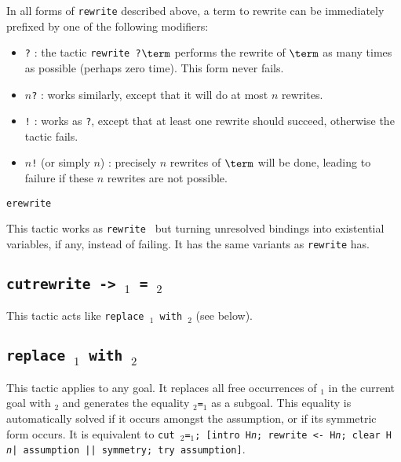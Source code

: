 \begin{coq_example*}
\begin{Variants}
\item In all forms of {\tt rewrite} described above, a term to rewrite
  can be immediately prefixed by one of the following modifiers:
  \begin{itemize}
  \item {\tt ?} : the tactic {\tt rewrite ?$\term$} performs the
    rewrite of $\term$  as many times as possible (perhaps zero time).
    This form never fails.
  \item {\tt $n$?} : works similarly, except that it will do at most
   $n$ rewrites.
  \item {\tt !} : works as {\tt ?}, except that at least one rewrite
    should succeed, otherwise the tactic fails.
  \item {\tt $n$!} (or simply {\tt $n$}) : precisely $n$ rewrites
    of $\term$ will be done, leading to failure if these $n$ rewrites are not possible.
  \end{itemize}

\item {\tt erewrite {\term}}

This tactic works as {\tt rewrite {\term}} but turning unresolved
bindings into existential variables, if any, instead of failing. It has
the same variants as {\tt rewrite} has.

\end{Variants}


\subsection{\tt cutrewrite -> \term$_1$ = \term$_2$
\label{cutrewrite}
}

This tactic acts like {\tt replace {\term$_1$} with {\term$_2$}}
(see below).

\subsection{\tt replace {\term$_1$} with {\term$_2$}
\label{tactic:replace}
}

This tactic applies to any goal. It replaces all free occurrences of
{\term$_1$} in the current goal with {\term$_2$} and generates the
equality {\term$_2$}{\tt =}{\term$_1$} as a subgoal. This equality is
automatically solved if it occurs amongst the assumption, or if its
symmetric form occurs.  It is equivalent to {\tt cut
\term$_2$=\term$_1$; [intro H{\sl n}; rewrite <- H{\sl n}; clear H{\sl
n}| assumption || symmetry; try assumption]}.


\end{coq_example*}
